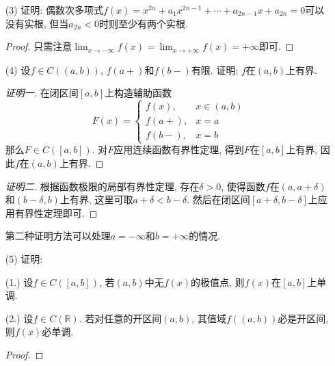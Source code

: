 \documentclass[UTF8,11pt, a4paper, oneside, fontset=none]{ctexbook}
\begin{document}
\begin{itemize}
\begin{proof}

注意此时$|f| \in C([a, b])$, 对$|f|$使用零点定理, 在题设条件下可见最小值只能是0. 这时最小值点是$|f|$的零点, 也是$f$的零点.
\end{proof}



\item[(3)] 证明: 偶数次多项式$f(x) = x^{2n} + a_1 x^{2n-1} + \cdots + a_{2n-1} x + a_{2n} = 0$可以没有实根, 但当$a_{2n}<0$时则至少有两个实根.


\begin{proof}

只需注意$\lim_{x \to -\infty} f(x) = \lim_{x \to +\infty}f(x) = +\infty$即可.

\end{proof}


\item[(4)] 设$f \in C((a, b))$, $f(a+)$和$f(b-)$有限. 证明: $f$在$(a, b)$上有界.

\begin{proof}[证明一]

在闭区间$[a, b]$上构造辅助函数
\[
F(x) = \begin{cases} 
f(x), & x \in (a, b)\\
f(a+), & x =a\\
f(b-), & x =b
\end{cases}
\]
那么$F \in C([a, b])$. 对$F$应用连续函数有界性定理, 得到$F$在$[a, b]$上有界, 因此$f$在$(a, b)$上有界.
\end{proof}


\begin{proof}[证明二]

根据函数极限的局部有界性定理, 存在$\delta>0$, 使得函数$f$在$(a, a+\delta)$和$(b-\delta, b)$上有界, 这里可取$a+\delta < b - \delta$. 然后在闭区间$[a+\delta, b-\delta]$上应用有界性定理即可.

\end{proof}


第二种证明方法可以处理$a=-\infty$和$b = +\infty$的情况.



\item[(5)] 证明:

(1.) 设$f \in C([a, b])$, 若$(a, b)$中无$f(x)$的极值点, 则$f(x)$在$[a, b]$上单调.

(2.) 设$f \in C(\mathbb R)$. 若对任意的开区间$(a, b)$, 其值域$f((a, b))$必是开区间, 则$f(x)$必单调.


\begin{proof}


\end{proof}
\end{itemize}
\end{document}
